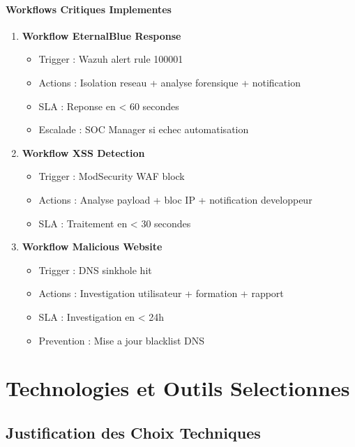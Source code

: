 \paragraph{Workflows Critiques Implementes}

\begin{enumerate}
    \item \textbf{Workflow EternalBlue Response}
          \begin{itemize}
              \item Trigger : Wazuh alert rule 100001
              \item Actions : Isolation reseau + analyse forensique + notification
              \item SLA : Reponse en < 60 secondes
              \item Escalade : SOC Manager si echec automatisation
          \end{itemize}

    \item \textbf{Workflow XSS Detection}
          \begin{itemize}
              \item Trigger : ModSecurity WAF block
              \item Actions : Analyse payload + bloc IP + notification developpeur
              \item SLA : Traitement en < 30 secondes
          \end{itemize}

    \item \textbf{Workflow Malicious Website}
          \begin{itemize}
              \item Trigger : DNS sinkhole hit
              \item Actions : Investigation utilisateur + formation + rapport
              \item SLA : Investigation en < 24h
              \item Prevention : Mise a jour blacklist DNS
          \end{itemize}
\end{enumerate}

\section{Technologies et Outils Selectionnes}

\subsection{Justification des Choix Techniques}


